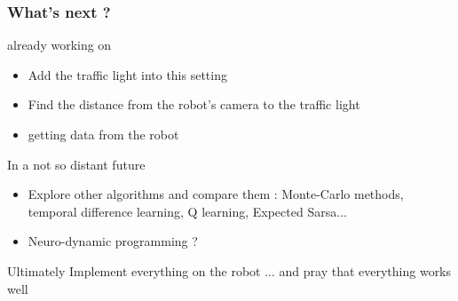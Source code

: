 \documentclass[dvipsnames,svgnames]{beamer}
\begin{document}
\begin{frame}
\frametitle{What's next ? }



\begin{block}{already working on}
\begin{itemize}
\item Add the traffic light into this setting
\item Find the distance from the robot's camera to the traffic light
\item getting data from the robot 
\end{itemize}
\end{block}

\begin{block}{In a not so distant future}
\begin{itemize}
\item Explore other algorithms and compare them : Monte-Carlo methods, temporal difference learning, Q learning, Expected Sarsa$\ldots$
\item Neuro-dynamic programming ?
\end{itemize}
\end{block}

\pause
\begin{block}{Ultimately}
Implement everything on the robot ... \pause and pray that everything works well
\end{block}

\end{frame}
\end{document}
